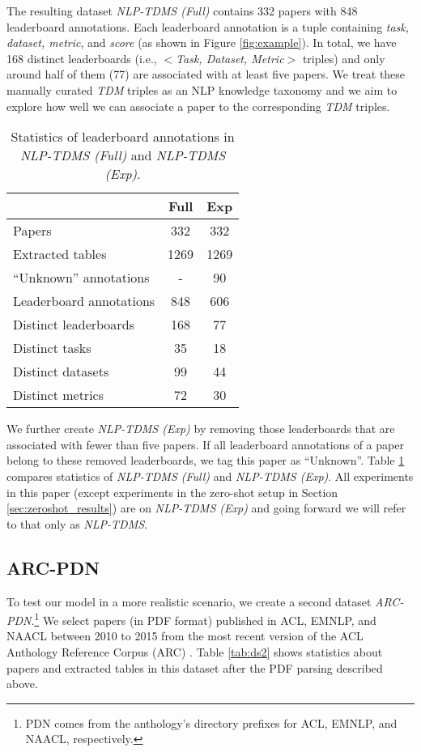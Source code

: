 \documentclass[11pt,a4paper]{article}
\begin{document}
The resulting dataset \emph{NLP-TDMS (Full)} contains 332 papers with 848 leaderboard annotations. Each leaderboard annotation is a tuple containing \emph{task, dataset, metric}, and \emph{score} (as shown in Figure \ref{fig:example}). In total, we have 168 distinct leaderboards (i.e., $<$\emph{Task, Dataset, Metric}$>$ triples) and only around half of them (77) are associated with at least five papers. We treat these manually curated  \emph{TDM} triples as an NLP knowledge taxonomy and we aim to explore how well we can associate a paper to the corresponding \emph{TDM} triples.

\begin{table}[t]
\begin{center}
\begin{tabular}{@{}lcc@{}}
&Full&Exp\\ \hline
Papers   &332&332\\ Extracted tables   &1269&1269\\ ``Unknown'' annotations &-&90\\ \hline 
Leaderboard annotations &  848&606\\ 
\enspace\enspace Distinct leaderboards& 168&77\\
\enspace\enspace Distinct tasks & 35&18\\
\enspace\enspace Distinct datasets &99&44\\
\enspace\enspace Distinct metrics & 72&30\\
 \hline
\end{tabular}
\end{center}
\caption{\label{tab:ds1}  Statistics of leaderboard annotations in \emph{NLP-TDMS (Full)} and \emph{NLP-TDMS (Exp)}.}
\end{table}


We further create \emph{NLP-TDMS (Exp)} by removing those leaderboards that are associated with fewer than five papers. If all leaderboard annotations of a paper belong to 
these removed leaderboards, we tag this paper as ``Unknown''. Table \ref{tab:ds1} compares 
statistics of \emph{NLP-TDMS (Full)} and \emph{NLP-TDMS (Exp)}.
All experiments in this paper (except experiments in the zero-shot setup in Section \ref{sec:zeroshot_results}) are on \emph{NLP-TDMS (Exp)} and going forward we will refer to that only as \emph{NLP-TDMS}.





\subsection{ARC-PDN}
\label{sec:ds2}
To test our model in a more realistic scenario, we create a second dataset \emph{ARC-PDN}.\footnote{PDN comes from the anthology's directory prefixes for ACL, EMNLP, and NAACL, respectively.}
We select papers (in PDF format) published in ACL, EMNLP, and NAACL between 2010 to 2015 from the most recent version of the ACL Anthology Reference Corpus (ARC) \cite{L08-1005}.
Table \ref{tab:ds2} shows statistics about papers and extracted tables in this dataset after the PDF parsing described above.
\end{document}
